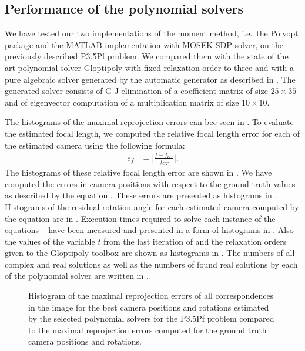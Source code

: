 \subsection{Performance of the polynomial solvers}
We have tested our two implementations of the moment method, i.e.\ the Polyopt package and the MATLAB implementation with MOSEK SDP solver, on the previously described P3.5Pf problem.
We compared them with the state of the art polynomial solver Gloptipoly with fixed relaxation order to three and with a pure algebraic solver generated by the automatic generator \cite{autogen} as described in \cite{P35Pf}.
The generated solver consists of G-J elimination of a coefficient matrix of size $25 \times 35$ and of eigenvector computation of a multiplication matrix of size $10 \times 10$.

The histograms of the maximal reprojection errors can bee seen in .
To evaluate the estimated focal length, we computed the relative focal length error for each of the estimated camera using the following formula:
\begin{align}
  e_f &= \bigg|\frac{f-f_{GT}}{f_{GT}}\bigg|.
\end{align}
The histograms of these relative focal length error are shown in .
We have computed the errors in camera positions with respect to the ground truth values as described by the equation .
These errors are presented as histograms in .
Histograms of the residual rotation angle for each estimated camera computed by the equation  are in .
Execution times required to solve each instance of the equations  --  have been measured and presented in a form of histograms in .
Also the values of the variable $t$ from the last iteration of  and the relaxation orders given to the Gloptipoly toolbox are shown as histograms in .
The numbers of all complex and real solutions as well as the numbers of found real solutions by each of the polynomial solver are written in .

\begin{figure}[ht]
  \centering
  \resizebox{0.95\textwidth}{!}{}
  \caption{Histogram of the maximal reprojection errors of all correspondences in the image for the best camera positions and rotations estimated by the selected polynomial solvers for the P3.5Pf problem compared to the maximal reprojection errors computed for the ground truth camera positions and rotations.}
\end{figure}

